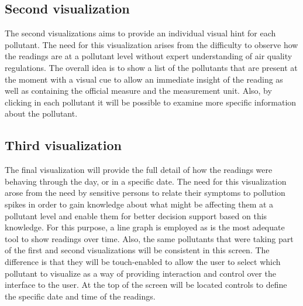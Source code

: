 \subsection{Second visualization}

The second visualizations aims to provide an individual visual hint for each pollutant. The need for this visualization arises from the difficulty to observe how the readings are at a pollutant level without expert understanding of air quality regulations. The overall idea is to show a list of the pollutants that are present at the moment with a visual cue to allow an immediate insight of the reading as well as containing the official measure and the measurement unit. Also, by clicking in each pollutant it will be possible to examine more specific information about the pollutant.

\subsection{Third visualization}

The final visualization will provide the full detail of how the readings were behaving through the day, or in a specific date. The need for this visualization arose from the need by sensitive persons to relate their symptoms to pollution spikes in order to gain knowledge about what might be affecting them at a pollutant level and enable them for better decision support based on this knowledge. For this purpose, a line graph is employed as is the most adequate tool to show readings over time. Also, the same pollutants that were taking part of the first and second visualizations will be consistent in this screen. The difference is that they will be touch-enabled to allow the user to select which  pollutant to visualize as a way of providing interaction and control over the interface to the user. At the top of the screen will be located controls to define the specific date and time of the readings. 
